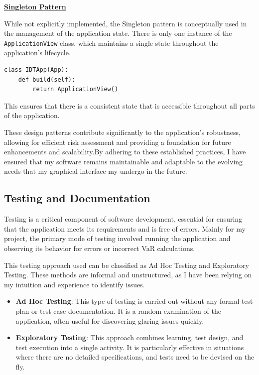 \documentclass{article}
\begin{document}
\underline{\textbf{Singleton Pattern}}\\\vspace{0.3cm}

While not explicitly implemented, the Singleton pattern is conceptually used in the management of the application state. There is only one instance of the \texttt{ApplicationView} class, which maintains a single state throughout the application's lifecycle.

\begin{verbatim}
class IDTApp(App):
    def build(self):
        return ApplicationView()
\end{verbatim}

This ensures that there is a consistent state that is accessible throughout all parts of the application.\\\vspace{0.3cm}

These design patterns contribute significantly to the application's robustness, allowing for efficient risk assessment and providing a foundation for future enhancements and scalability.By adhering to these established practices, I have ensured that my software remains maintainable and adaptable to the evolving needs that my graphical interface my undergo in the future.



\subsection{Testing and Documentation}

Testing is a critical component of software development, essential for ensuring that the application meets its requirements and is free of errors. Mainly for my project, the primary mode of testing involved running the application and observing its behavior for errors or incorrect VaR calculations.\\\vspace{0.3cm}

This testing approach used can be classified as Ad Hoc Testing and Exploratory Testing. These methods are informal and unstructured, as I have been relying on my intuition and experience to identify issues.

\begin{itemize}
    \item \textbf{Ad Hoc Testing}: This type of testing is carried out without any formal test plan or test case documentation. It is a random examination of the application, often useful for discovering glaring issues quickly.
    \item \textbf{Exploratory Testing}: This approach combines learning, test design, and test execution into a single activity. It is particularly effective in situations where there are no detailed specifications, and tests need to be devised on the fly.
\end{itemize}
\end{document}

